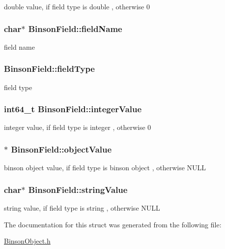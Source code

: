 double value, if field type is double , otherwise 0 \hypertarget{structBinsonField_a8e38391c6f73e3990fea571fd0727464}{
\subsubsection[{field\-Name}]{\setlength{\rightskip}{0pt plus 5cm}char$\ast$ Binson\-Field\-::field\-Name}}\label{structBinsonField_a8e38391c6f73e3990fea571fd0727464}
field name \hypertarget{structBinsonField_af4bacf88052af7898a681ffc5742064a}{
\subsubsection[{field\-Type}]{ Binson\-Field\-::field\-Type}}\label{structBinsonField_af4bacf88052af7898a681ffc5742064a}
field type \hypertarget{structBinsonField_a88bc4483faecd28e1671135d2eb911b8}{
\subsubsection[{integer\-Value}]{\setlength{\rightskip}{0pt plus 5cm}int64\-\_\-t Binson\-Field\-::integer\-Value}}\label{structBinsonField_a88bc4483faecd28e1671135d2eb911b8}
integer value, if field type is integer , otherwise 0 \hypertarget{structBinsonField_abc7256cc86bc89a5d4946e7a2cdea809}{
\subsubsection[{object\-Value}]{$\ast$ Binson\-Field\-::object\-Value}}\label{structBinsonField_abc7256cc86bc89a5d4946e7a2cdea809}
binson object value, if field type is binson object , otherwise N\-U\-L\-L \hypertarget{structBinsonField_a3ffa60989adcf3dd00b3caa00b7b2677}{
\subsubsection[{string\-Value}]{\setlength{\rightskip}{0pt plus 5cm}char$\ast$ Binson\-Field\-::string\-Value}}\label{structBinsonField_a3ffa60989adcf3dd00b3caa00b7b2677}
string value, if field type is string , otherwise N\-U\-L\-L 

The documentation for this struct was generated from the following file\-:\begin{DoxyCompactItemize}
\item 
\hyperlink{BinsonObject_8h}{Binson\-Object.\-h}\end{DoxyCompactItemize}
